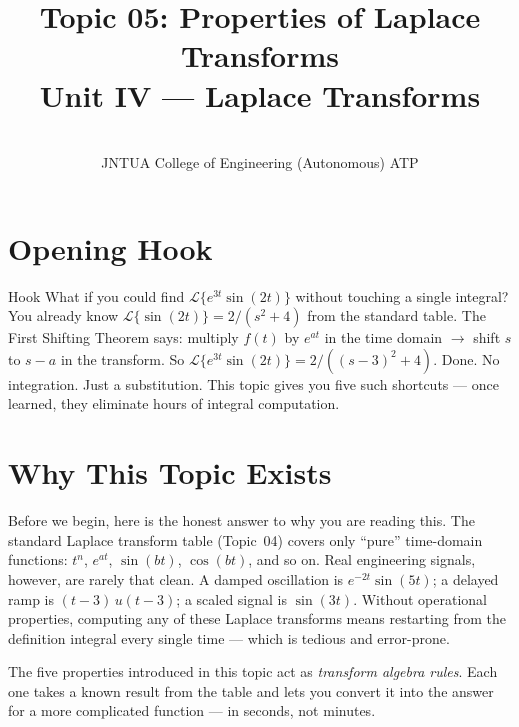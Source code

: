 \documentclass[12pt,a4paper]{article}
\title{Topic 05: Properties of Laplace Transforms \\ \large Unit IV --- Laplace Transforms}
\author{ \\ JNTUA College of Engineering (Autonomous) ATP}
\date{}
\begin{document}
\maketitle
\tableofcontents
\newpage

\section{Opening Hook}
\begin{curiositybox}{Hook}
What if you could find $\mathcal{L}\{e^{3t}\sin(2t)\}$ without touching a single integral?
You already know $\mathcal{L}\{\sin(2t)\} = 2/(s^2+4)$ from the standard table.
The First Shifting Theorem says: multiply $f(t)$ by $e^{at}$ in the time domain $\to$ shift $s$
to $s-a$ in the transform. So $\mathcal{L}\{e^{3t}\sin(2t)\} = 2/((s-3)^2+4)$. Done. No
integration. Just a substitution. This topic gives you five such shortcuts --- once learned,
they eliminate hours of integral computation.
\end{curiositybox}

\section{Why This Topic Exists}
Before we begin, here is the honest answer to why you are reading this. The standard Laplace
transform table (Topic~04) covers only ``pure'' time-domain functions: $t^n$, $e^{at}$,
$\sin(bt)$, $\cos(bt)$, and so on. Real engineering signals, however, are rarely that clean.
A damped oscillation is $e^{-2t}\sin(5t)$; a delayed ramp is $(t-3)\,u(t-3)$; a scaled
signal is $\sin(3t)$. Without operational properties, computing any of these Laplace
transforms means restarting from the definition integral every single time --- which is tedious
and error-prone.

The five properties introduced in this topic act as \emph{transform algebra rules}. Each one
takes a known result from the table and lets you convert it into the answer for a more
complicated function --- in seconds, not minutes.
\end{document}
